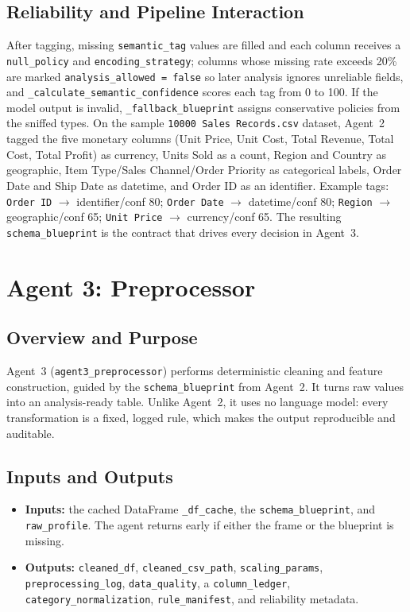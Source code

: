 \documentclass[12pt,a4paper,openany]{report}
\begin{document}
\subsection{Reliability and Pipeline Interaction}
After tagging, missing \texttt{semantic\_tag} values are filled and each column receives a \texttt{null\_policy} and \texttt{encoding\_strategy}; columns whose missing rate exceeds 20\% are marked \texttt{analysis\_allowed = false} so later analysis ignores unreliable fields, and \texttt{\_calculate\_semantic\_confidence} scores each tag from 0 to 100. If the model output is invalid, \texttt{\_fallback\_blueprint} assigns conservative policies from the sniffed types. On the sample \texttt{10000 Sales Records.csv} dataset, Agent~2 tagged the five monetary columns (Unit Price, Unit Cost, Total Revenue, Total Cost, Total Profit) as currency, Units Sold as a count, Region and Country as geographic, Item Type/Sales Channel/Order Priority as categorical labels, Order Date and Ship Date as datetime, and Order ID as an identifier. Example tags: \texttt{Order ID} $\rightarrow$ identifier/conf 80; \texttt{Order Date} $\rightarrow$ datetime/conf 80; \texttt{Region} $\rightarrow$ geographic/conf 65; \texttt{Unit Price} $\rightarrow$ currency/conf 65. The resulting \texttt{schema\_blueprint} is the contract that drives every decision in Agent~3.

\section{Agent 3: Preprocessor}

\subsection{Overview and Purpose}
Agent~3 (\texttt{agent3\_preprocessor}) performs deterministic cleaning and feature construction, guided by the \texttt{schema\_blueprint} from Agent~2. It turns raw values into an analysis-ready table. Unlike Agent~2, it uses no language model: every transformation is a fixed, logged rule, which makes the output reproducible and auditable.

\subsection{Inputs and Outputs}
\begin{itemize}
	\item \textbf{Inputs:} the cached DataFrame \texttt{\_df\_cache}, the \texttt{schema\_blueprint}, and \texttt{raw\_profile}. The agent returns early if either the frame or the blueprint is missing.
	\item \textbf{Outputs:} \texttt{cleaned\_df}, \texttt{cleaned\_csv\_path}, \texttt{scaling\_params}, \texttt{preprocessing\_log}, \texttt{data\_quality}, a \texttt{column\_ledger}, \texttt{category\_normalization}, \texttt{rule\_manifest}, and reliability metadata.
\end{itemize}
\end{document}

